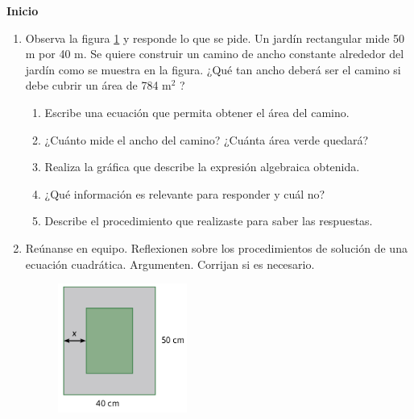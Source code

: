 \documentclass[11pt]{book}
\begin{document}
\begin{boxK}
    \begin{center}\textbf{Inicio}\end{center}
    \begin{enumerate}
        \item Observa la figura \ref{fig:camino} y responde lo que se pide.
              Un jardín rectangular mide 50 m por 40 m. Se quiere construir un camino de ancho
              constante alrededor del jardín como se muestra en la figura. ¿Qué tan ancho deberá
              ser el camino si debe cubrir un área de 784 m$^2$ ?
              \begin{enumerate}
                  \item Escribe una ecuación que permita obtener el área del camino.
                  \item ¿Cuánto mide el ancho del camino? ¿Cuánta área verde quedará?
                  \item Realiza la gráfica que describe la expresión algebraica obtenida.
                  \item ¿Qué información es relevante para responder y cuál no?
                  \item Describe el procedimiento que realizaste para saber las respuestas.
              \end{enumerate}
        \item Reúnanse en equipo. Reflexionen sobre los procedimientos de solución
              de una ecuación cuadrática. Argumenten. Corrijan si es necesario.
              \begin{figure}[H]
                  \centering
                  \includegraphics[width=0.4\textwidth]{camino.png}
                  \label{fig:camino}
              \end{figure}
    \end{enumerate}
\end{boxK}
\end{document}
